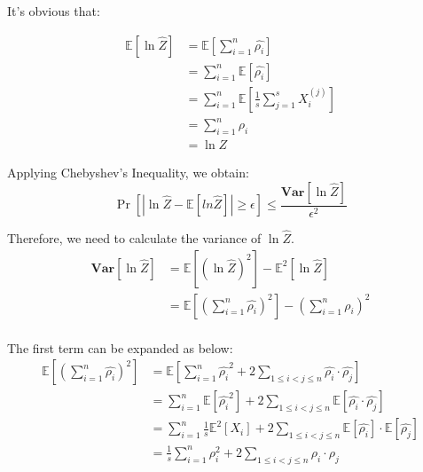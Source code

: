 \documentclass[a4paper, 12pt, titlepage]{article}
\begin{document}
It's obvious that:

\begin{equation}
    \begin{aligned}
        \mathbb E \left[ \ln{\hat{Z}}\right] &= \mathbb E \left[ \sum_{i = 1}^{n} \hat{\rho_{i}} \right] \\
                                             &= \sum_{i = 1}^{n} \mathbb E \left[ \hat{\rho_{i}} \right] \\
                                             &= \sum_{i = 1}^{n} \mathbb E \left[ \frac{1}{s} \sum_{j = 1}^{s} X_{i}^{(j)} \right] \\
                                             &= \sum_{i = 1}^{n} \rho_{i} \\
                                             &= \ln{Z}
    \end{aligned}
\end{equation}

Applying Chebyshev's Inequality, we obtain:
\[
    \Pr \left[ |\ln{\hat{Z}} - \mathbb E \left[ ln{\hat{Z}} \right] | \geq \epsilon \right] \leq \frac{\mathbf{Var} \left[ \ln{\hat{Z}}\right] }{\epsilon^{2}}
\]

Therefore, we need to calculate the variance of $\ln{\hat{Z}}$.
\begin{equation}
    \begin{aligned}
        \mathbf{Var} \left[ \ln{\hat{Z}} \right] &= \mathbb E \left[ \left( \ln{\hat{Z}} \right)^2 \right] - \mathbb E^2 \left[ \ln{\hat{Z}} \right]\\
                                                 &= \mathbb E \left[ \left( \sum_{i = 1}^{n} \hat{\rho_{i}} \right)^2 \right] - \left( \sum_{i = 1}^{n} \rho_{i} \right)^2 \\
    \end{aligned}
\end{equation}

The first term can be expanded as below:
\begin{equation}
    \begin{aligned}
        \mathbb E \left[ \left( \sum_{i = 1}^{n} \hat{\rho_{i}} \right)^2 \right] &= \mathbb E \left[ \sum_{i = 1}^{n} \hat{\rho_{i}}^2 + 2 \sum_{1 \leq i < j \leq n} \hat{\rho_{i}} \cdot \hat{\rho_{j}}\right] \\
                                                                                  &= \sum_{i = 1}^{n} \mathbb E \left[ \hat{\rho_{i}}^2 \right] + 2 \sum_{1 \leq i < j \leq n} \mathbb E \left[ \hat{\rho_{i}} \cdot \hat{\rho_{j}} \right] \\
                                                                                  &= \sum_{i = 1}^{n} \frac{1}{s} \mathbb E^2 \left[ X_{i} \right] + 2 \sum_{1 \leq i < j \leq n} \mathbb E \left[ \hat{\rho_{i}} \right] \cdot \mathbb E\left[ \hat{\rho_{j}} \right] \\
                                                                                  &= \frac{1}{s} \sum_{i = 1}^{n}  \rho_{i}^2 + 2 \sum_{1 \leq i < j \leq n} \rho_{i} \cdot \rho_{j}
    \end{aligned}
\end{equation}
\end{document}
